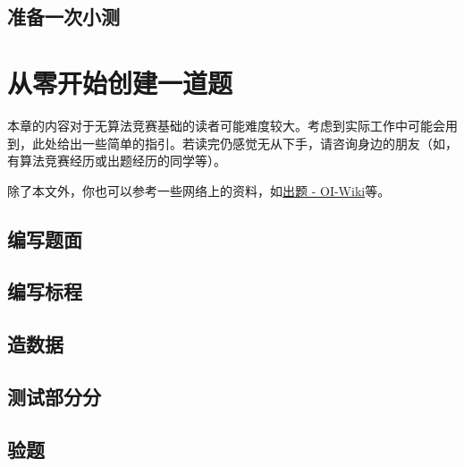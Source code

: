 \documentclass[oneside]{book}
\begin{document}
\section{准备一次小测}


\chapter{从零开始创建一道题}

\label{chap:create_problem}

本章的内容对于无算法竞赛基础的读者可能难度较大。考虑到实际工作中可能会用到，此处给出一些简单的指引。若读完仍感觉无从下手，请咨询身边的朋友（如，有算法竞赛经历或出题经历的同学等）。

除了本文外，你也可以参考一些网络上的资料，如\href{https://oi-wiki.org/contest/problemsetting/}{出题 - OI-Wiki}等。


\section{编写题面}

\section{编写标程}

\section{造数据}

\label{sec:generating_data}

\section{测试部分分}

\section{验题}
\end{document}
